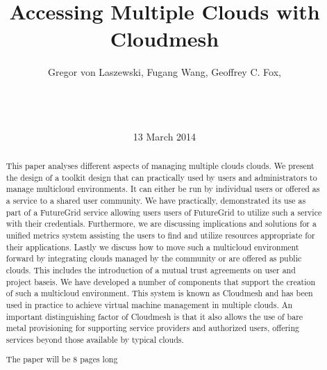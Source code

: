 \documentclass{tex/sig-alternate}
\newcommand{\TITLE}{Accessing Multiple  Clouds with Cloudmesh}
\begin{document}
 
% 
 
\title{\TITLE} 
 
\author{ 
\alignauthor 
Gregor von Laszewski, 
Fugang Wang, 
Geoffrey C. Fox, \\
       \\
       \\
       \\ 
} 
\date{13 March 2014} 
 
\toappear{} 
\maketitle 
\begin{abstract} 

  This paper analyses different aspects of managing multiple clouds
  clouds. We present the design of a toolkit design that can
  practically used by users and administrators to manage multicloud
  environments.  It can either be run by individual users or offered
  as a service to a shared user community. We have practically,
  demonstrated its use as part of a FutureGrid service allowing users
  users of FutureGrid to utilize such a service with their
  credentials. Furthermore, we are discussing implications and
  solutions for a unified metrics system assisting the users to find
  and utilize resources appropriate for their applications. Lastly we
  discuss how to move such a multicloud environment forward by
  integrating clouds managed by the community or are offered as public
  clouds. This includes the introduction of a mutual trust agreements
  on user and project baseis. We have developed a number of components
  that support the creation of such a multicloud environment. This
  system is known as Cloudmesh and has been used in practice to
  achieve virtual machine management in multiple clouds. An important
  distinguishing factor of Cloudmesh is that it also allows the use of
  bare metal provisioning for supporting service providers and
  authorized users, offering services beyond those available by
  typical clouds.

  The paper will be 8 pages long 
 
\end{abstract} 
 
\end{document}
